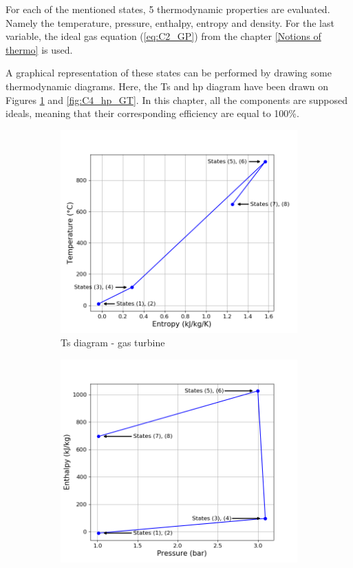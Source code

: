 For each of the mentioned states, 5 thermodynamic properties are evaluated. Namely the temperature, pressure, enthalpy, entropy and density. For the last variable, the ideal gas equation (\ref{eq:C2_GP}) from the chapter \ref{Notions of thermo} is used. 

A graphical representation of these states can be performed by drawing some thermodynamic diagrams. Here, the Ts and hp diagram have been drawn on Figures \ref{fig:C4_Ts_GT} and \ref{fig:C4_hp_GT}. In this chapter, all the components are supposed ideals, meaning that their corresponding efficiency are equal to 100\%.

\begin{figure}[h]
     \centering
     \begin{subfigure}[b]{0.4\textwidth}
         \centering
         \includegraphics[width=\textwidth]{Ts_GT}
         \caption{Ts diagram - gas turbine}
         \label{fig:C4_Ts_GT}
     \end{subfigure}
     \begin{subfigure}[b]{0.4\textwidth}
         \centering
         \includegraphics[width=\textwidth]{hp_GT}

\end{subfigure}
\end{figure}
